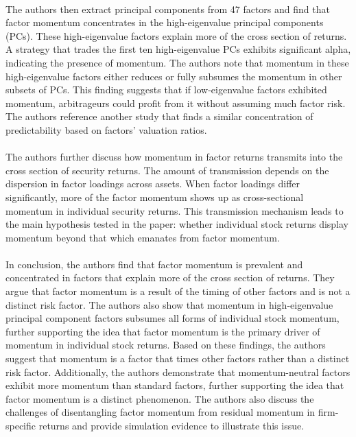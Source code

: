 \documentclass{article}
\begin{document}
\\
The authors then extract principal components from 47 factors and find that factor momentum concentrates in the high-eigenvalue principal components (PCs). These high-eigenvalue factors explain more of the cross section of returns. A strategy that trades the first ten high-eigenvalue PCs exhibits significant alpha, indicating the presence of momentum. The authors note that momentum in these high-eigenvalue factors either reduces or fully subsumes the momentum in other subsets of PCs. This finding suggests that if low-eigenvalue factors exhibited momentum, arbitrageurs could profit from it without assuming much factor risk. The authors reference another study that finds a similar concentration of predictability based on factors' valuation ratios. \\
\\
The authors further discuss how momentum in factor returns transmits into the cross section of security returns. The amount of transmission depends on the dispersion in factor loadings across assets. When factor loadings differ significantly, more of the factor momentum shows up as cross-sectional momentum in individual security returns. This transmission mechanism leads to the main hypothesis tested in the paper: whether individual stock returns display momentum beyond that which emanates from factor momentum. \\
\\
In conclusion, the authors find that factor momentum is prevalent and concentrated in factors that explain more of the cross section of returns. They argue that factor momentum is a result of the timing of other factors and is not a distinct risk factor. The authors also show that momentum in high-eigenvalue principal component factors subsumes all forms of individual stock momentum, further supporting the idea that factor momentum is the primary driver of momentum in individual stock returns. Based on these findings, the authors suggest that momentum is a factor that times other factors rather than a distinct risk factor. Additionally, the authors demonstrate that momentum-neutral factors exhibit more momentum than standard factors, further supporting the idea that factor momentum is a distinct phenomenon. The authors also discuss the challenges of disentangling factor momentum from residual momentum in firm-specific returns and provide simulation evidence to illustrate this issue. 
\end{document}
